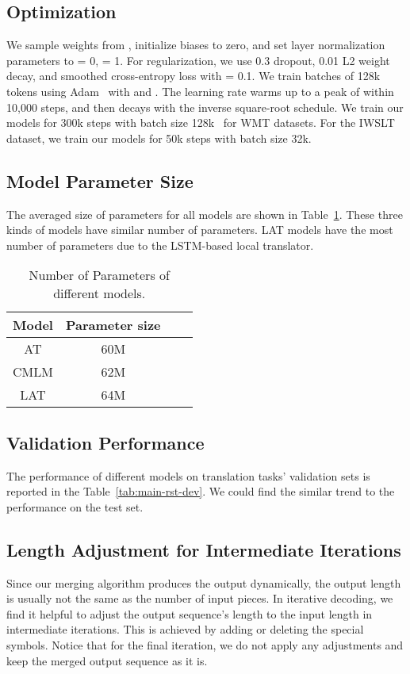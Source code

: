 \documentclass[11pt,a4paper]{article}
\begin{document}
\subsection{Optimization}
We sample weights from , initialize biases to zero, and set layer normalization parameters to  = 0,  = 1.
For regularization, we use 0.3 dropout, 0.01 L2
weight decay, and smoothed cross-entropy loss
with  = 0.1. We train batches of 128k tokens using Adam~\cite{adam2015} with  and . The learning rate warms up to a peak of  within 10,000 steps, and then decays with the inverse square-root schedule. 
We train our models for 300k steps with batch size 128k~\cite{ghazvininejad-etal-2019-mask} for WMT datasets. For the IWSLT dataset, we train our models for 50k steps with batch size 32k.  

\subsection{Model Parameter Size}
The averaged size of parameters for all models are shown in Table~\ref{tab:param_size}. These three kinds of models have similar number of parameters. LAT models have the most number of parameters due to the LSTM-based local translator.
\begin{table}[!ht]
    \centering
    \begin{tabular}{c|ccc}
    \toprule
        Model &  Parameter size\\
        \midrule
        AT & 60M \\
        CMLM & 62M\\
        LAT & 64M \\
        \bottomrule
    \end{tabular}
    \caption{Number of Parameters of different models.}
    \label{tab:param_size}
\end{table}
\subsection{Validation Performance}
The performance of different models on translation tasks' validation sets is reported in the Table~\ref{tab:main-rst-dev}. We could find the similar trend to the performance on the test set.

\subsection{Length Adjustment for Intermediate Iterations}

Since our merging algorithm produces the output dynamically, the output length is usually not the same as the number of input pieces. In iterative decoding, we find it helpful to adjust the output sequence's length to the input length in intermediate iterations. This is achieved by adding or deleting the special  symbols. Notice that for the final iteration, we do not apply any adjustments and keep the merged output sequence as it is.
\end{document}
